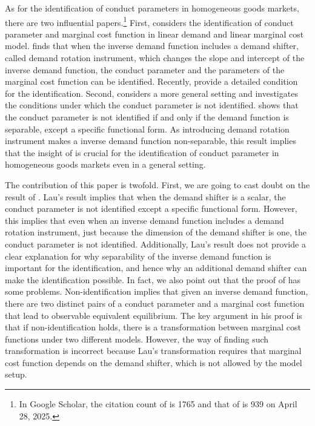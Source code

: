\documentclass[11pt, a4paper]{article}
\theoremstyle{remark}
\begin{document}
As for the identification of conduct parameters in homogeneous goods markets, there are two influential papers.\footnote{In Google Scholar, the citation count of \citet{bresnahan1982oligopoly} is 1765 and that of \citet{lau1982identifying} is 939 on April 28, 2025.}
First, \citet{bresnahan1982oligopoly} considers the identification of conduct parameter and marginal cost function in linear demand and linear marginal cost model.
\citet{bresnahan1982oligopoly} finds that when the inverse demand function includes a demand shifter, called demand rotation instrument, which changes the slope and intercept of the inverse demand function, the conduct parameter and the parameters of the marginal cost function can be identified.
Recently, \citet{matsumura2023resolving} provide a detailed condition for the identification.
Second, \citet{lau1982identifying} considers a more general setting and investigates the conditions under which the conduct parameter is not identified.
\citet{lau1982identifying} shows that the conduct parameter is not identified if and only if the demand function is separable, except a specific functional form.
As introducing demand rotation instrument makes a inverse demand function non-separable, this result implies that the insight of \citet{bresnahan1982oligopoly} is crucial for the identification of conduct parameter in homogeneous goods markets even in a general setting.


The contribution of this paper is twofold.
First, we are going to cast doubt on the result of \citet{lau1982identifying}.
Lau's result implies that when the demand shifter is a scalar, the conduct parameter is not identified except a specific functional form.
However, this implies that even when an inverse demand function includes a demand rotation instrument, just because the dimension of the demand shifter is one, the conduct parameter is not identified.
Additionally, Lau's result does not provide a clear explanation for why separability of the inverse demand function is important for the identification, and hence why an additional demand shifter can make the identification possible.
In fact, we also point out that the proof of \citet{lau1982identifying} has some problems.
Non-identification implies that given an inverse demand function, there are two distinct pairs of a conduct parameter and a marginal cost function that lead to observable equivalent equilibrium.
The key argument in his proof is that if non-identification holds, there is a transformation between marginal cost functions under two different models.
However, the way of finding such transformation is incorrect because Lau's transformation requires that marginal cost function depends on the demand shifter, which is not allowed by the model setup.
\end{document}
